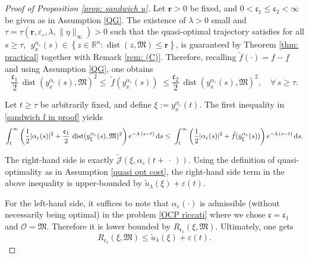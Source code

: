 \documentclass[12pt]{amsart}
\newcommand{\D}[1]{\mbox{\rm #1}}
\newcommand{\dd}{\D{d}}
\numberwithin{equation}{section}
\theoremstyle{plain}
\begin{document}
\begin{proof}[Proof of Proposition \ref{prop: sandwich u}]
Let $\mathbf{r}>0$ be fixed, and $0<\mathfrak{c}_{1}\leq \mathfrak{c}_{2}<\infty$ be given as in Assumption \ref{QG}. 
The existence of $\lambda>0$ small and $\tau = \tau(\mathbf{r},\varepsilon_{\circ},\lambda, \|\eta\|_{\infty})>0$  such that the quasi-optimal trajectory satisfies for all $s\geq \tau$,  $\;y_{x}^{\alpha_{\varepsilon}}(s) \in \left\{z\in \mathbb{R}^{n}: \operatorname{dist}(z,\mathfrak{M})\leq \mathbf{r}\right\}$, is guaranteed by Theorem \ref{thm: practical} together with Remark \ref{rem: (C)}. Therefore, recalling $\tilde{f}(\cdot)=f-\underline{f}$ and using Assumption \ref{QG}, one obtains
\begin{equation}\label{sandwich f in proof}
    \frac{\mathfrak{c}_{1}}{2} \, \operatorname{dist}(y_{x}^{\alpha_{\varepsilon}}(s),\mathfrak M)^2 \le \; \tilde{f}(y_{x}^{\alpha_{\varepsilon}}(s))  \; \le  \frac{\mathfrak{c}_{2}}{2} \, \operatorname{dist}(y_{x}^{\alpha_{\varepsilon}}(s),\mathfrak M)^2, \quad\forall\,s\geq \tau.
\end{equation}

Let $t\geq \tau$ be arbitrarily fixed, and define $\xi:= y_{x}^{\alpha_{\varepsilon}}(t)$.  The  first inequality in \eqref{sandwich f in proof} yields 
\begin{equation*}
    \int_{t}^{\infty}\left(\frac{1}{2}|\alpha_{\varepsilon}(s)|^{2} + \frac{\mathfrak{c}_{1}}{2} \, \operatorname{dist}(y_{\xi}^{\alpha_{\varepsilon}}(s),\mathfrak M)^2 \right)e^{-\lambda\,(s-t)}\,\dd s
    \leq \; \int_{t}^{\infty}\left(\frac{1}{2}|\alpha_{\varepsilon}(s)|^{2} + \tilde{f}(y_{\xi}^{\alpha_{\varepsilon}}(s))\right)e^{-\lambda\,(s-t)}\,\dd s.
\end{equation*}

The right-hand side is exactly $\widetilde{\mathscr{J}}(\xi,\alpha_{\varepsilon}(t+\,\cdot\,))$. Using the definition of quasi-optimality as in Assumption \ref{quasi opt cost}, the right-hand side term in the above inequality is upper-bounded by $\tilde{u}_{\lambda}(\xi) + \varepsilon(t)$. 

For the left-hand side, it suffices to note that $\alpha_{\varepsilon}(\cdot)$ is admissible (without necessarily being optimal) in the problem \eqref{OCP riccati} where we chose $\mathfrak{c}=\mathfrak{c}_{1}$ and $\mathscr{O}=\mathfrak{M}$. Therefore it is lower bounded by $R_{\mathfrak{c}_{1}}(\xi, \mathfrak{M})$. Ultimately, one gets
\begin{equation}\label{eq: low R}
    R_{\mathfrak{c}_{1}}(\xi, \mathfrak{M}) \leq \tilde{u}_{\lambda}(\xi) + \varepsilon(t).
\end{equation}


\end{proof}
\end{document}

